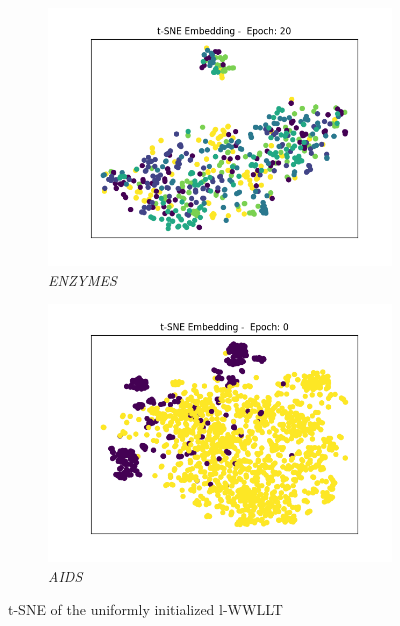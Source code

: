 		\begin{figure}[H]
			\centering
			\begin{subfigure}{0.49\textwidth}
				\centering
				\includegraphics[width=1.1\linewidth]{images/plotA4_tSNE_e20_ENZYMES_GDL_04_18h-15m}
				\caption{\textit{ENZYMES}}
				\label{fig:plota4tsnee20enzymesgdl0418h}
			\end{subfigure}
			\begin{subfigure}{0.49\textwidth}
				\centering
				\includegraphics[width=1.1\linewidth]{images/plotA4_tSNE_e0_AIDS}
				\caption{\textit{AIDS}}
				\label{fig:plota4tsnee0aids}
			\end{subfigure}
			\caption{t-SNE of the uniformly initialized l-WWLLT}
			\label{fig:tSNE_init}
		\end{figure}
		

